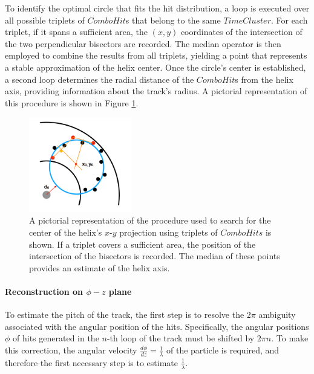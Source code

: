 To identify the optimal circle that fits the hit distribution, 
a loop is executed over all possible triplets of 
$ComboHit$s that belong to the same $TimeCluster$. 
For each triplet, if it spans a sufficient area, the 
$(x, y)$ coordinates of the intersection of the two 
perpendicular bisectors are recorded. The median operator 
is then employed to combine the results from all triplets, 
yielding a point that represents a stable approximation of 
the helix center. Once the circle's center is established, 
a second loop determines the radial distance of the 
$ComboHit$s from the helix axis, providing information 
about the track's radius. A pictorial representation of 
this procedure is shown in Figure \ref{fig:trkpatrec}.
\begin{figure}[!h]
    \centering
    \includegraphics[width =0.4\textwidth]{figures/png/Screenshot_20240810_160341.png}
    \caption[Procedure adopted to search for the center of the $x-y$
    projection of the helix.]{A pictorial representation of the procedure 
    used to search for the center of the helix's $x$-$y$ projection using 
    triplets of $ComboHits$ is shown. If a triplet covers a sufficient area, 
    the position of the intersection of the 
    bisectors is recorded. The median of these points provides an 
    estimate of the helix axis.}
    \label{fig:trkpatrec}
\end{figure}
\paragraph{Reconstruction on $\phi-z$ plane}
To estimate the pitch of the track, the first step 
is to resolve the $2\pi$ ambiguity associated with the 
angular position of the hits. Specifically, the angular 
positions $\phi$ of hits generated in the $n$-th loop of 
the track must be shifted by $2\pi n$. To make this 
correction, the angular velocity $\frac{d\phi}{dz} = \frac{1}{\lambda}$ 
of the particle is required, and therefore the first necessary 
step is to estimate $\frac{1}{\lambda}$.

